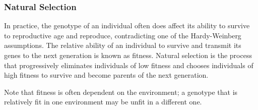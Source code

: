 \documentclass[12pt,titlepage]{article}
\begin{document}
      \subsubsection{Natural Selection}
        In practice, the genotype of an individual often does affect its ability to survive to reproductive age and reproduce, contradicting one of the
        Hardy-Weinberg assumptions. The relative ability of an individual to survive and transmit its genes to the next generation is known as fitness.
        Natural selection is the process that progressively eliminates individuals of low fitness and chooses individuals of high fitness to survive
        and become parents of the next generation.

        Note that fitness is often dependent on the environment; a genotype that is relatively fit in one environment may be unfit in a different one.
\end{document}
